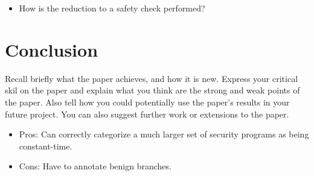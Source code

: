 \documentclass[11pt,a4paper]{article}
\begin{document}

\begin{itemize}
  \item How is the reduction to a safety check performed?
\end{itemize}

\section{Conclusion}
Recall  briefly what the paper achieves, and how it is new. Express your critical skil on the paper and explain what you think are the strong and weak points of the paper. Also tell how you could potentially use the paper's results in your future project. You can also suggest further work or extensions to the paper.

\begin{itemize}
  \item Pros: Can correctly categorize a much larger set of security programs as being constant-time.
  \item Cons: Have to annotate benign branches.
\end{itemize}




\end{document}
